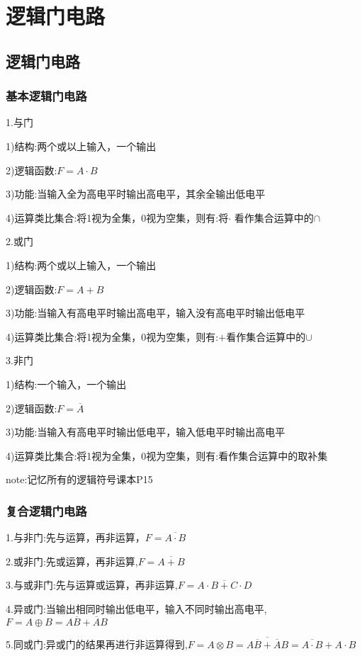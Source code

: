 \documentclass[11pt,twoside,a4paper]{ctexart}
\begin{document}
    \section{逻辑门电路}
    \subsection{逻辑门电路}
    \subsubsection{基本逻辑门电路}
    1.与门

    1)结构:两个或以上输入，一个输出

    2)逻辑函数:$F = A\cdot B $

    3)功能:当输入全为高电平时输出高电平，其余全输出低电平

    4)运算类比集合:将1视为全集，0视为空集，则有:将$\cdot $ 看作集合运算中的$\cap $ 

    2.或门

    1)结构:两个或以上输入，一个输出

    2)逻辑函数:$F = A + B $

    3)功能:当输入有高电平时输出高电平，输入没有高电平时输出低电平

    4)运算类比集合:将1视为全集，0视为空集，则有:$ + $看作集合运算中的$\cup $ 
    
    3.非门

    1)结构:一个输入，一个输出

    2)逻辑函数:$F =\overline{A}$

    3)功能:当输入有高电平时输出低电平，输入低电平时输出高电平

    4)运算类比集合:将1视为全集，0视为空集，则有:看作集合运算中的取补集

    note:记忆所有的逻辑符号课本P15

    \subsubsection{复合逻辑门电路}
    1.与非门:先与运算，再非运算，$F = \overline{A\cdot B} $

    2.或非门:先或运算，再非运算,$F = \overline{A + B} $

    3.与或非门:先与运算或运算，再非运算,$F = \overline{A\cdot B + C\cdot D} $

    4.异或门:当输出相同时输出低电平，输入不同时输出高电平,$F = A\oplus B = A\overline{B} + \overline{A}B $

    5.同或门:异或门的结果再进行非运算得到,$F = A\otimes B = \overline{A\overline{B} + \overline{A}B} = \overline{A\cdot B} + A\cdot B $
\end{document}
